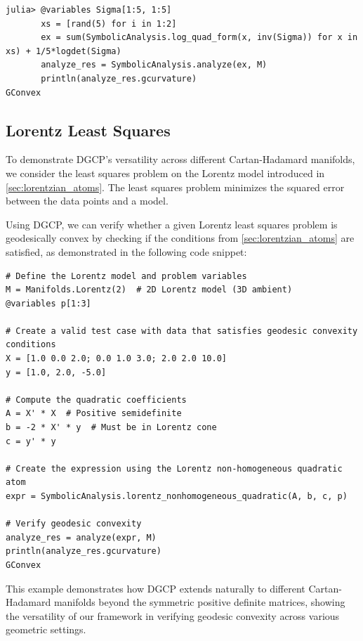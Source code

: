 \documentclass[twoside,11pt]{article}
\begin{document}
\begin{listing}[h!]
    \begin{verbatim}
julia> @variables Sigma[1:5, 1:5]
       xs = [rand(5) for i in 1:2]
       ex = sum(SymbolicAnalysis.log_quad_form(x, inv(Sigma)) for x in xs) + 1/5*logdet(Sigma)
       analyze_res = SymbolicAnalysis.analyze(ex, M)
       println(analyze_res.gcurvature)
GConvex
    \end{verbatim}
\end{listing}

\newpage

\subsection{Lorentz Least Squares}

To demonstrate DGCP's versatility across different Cartan-Hadamard manifolds, we consider the least squares problem on the Lorentz model introduced in \ref{sec:lorentzian_atoms}. The least squares problem minimizes the squared error between the data points and a model.

Using DGCP, we can verify whether a given Lorentz least squares problem is geodesically convex by checking if the conditions from \ref{sec:lorentzian_atoms} are satisfied, as demonstrated in the following code snippet:

\begin{listing}[h!]
\begin{verbatim}
# Define the Lorentz model and problem variables
M = Manifolds.Lorentz(2)  # 2D Lorentz model (3D ambient)
@variables p[1:3]

# Create a valid test case with data that satisfies geodesic convexity conditions
X = [1.0 0.0 2.0; 0.0 1.0 3.0; 2.0 2.0 10.0]
y = [1.0, 2.0, -5.0]

# Compute the quadratic coefficients
A = X' * X  # Positive semidefinite
b = -2 * X' * y  # Must be in Lorentz cone
c = y' * y

# Create the expression using the Lorentz non-homogeneous quadratic atom
expr = SymbolicAnalysis.lorentz_nonhomogeneous_quadratic(A, b, c, p)

# Verify geodesic convexity
analyze_res = analyze(expr, M)
println(analyze_res.gcurvature)
GConvex
\end{verbatim}
\end{listing}

This example demonstrates how DGCP extends naturally to different Cartan-Hadamard manifolds beyond the symmetric positive definite matrices, showing the versatility of our framework in verifying geodesic convexity across various geometric settings.
\newpage
\end{document}

